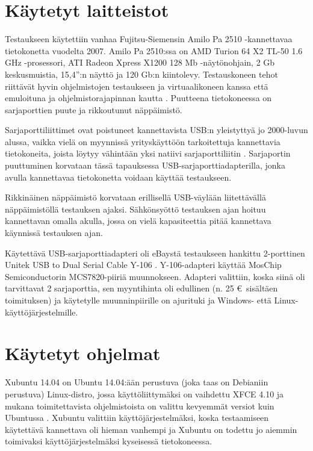 \section{Käytetyt laitteistot}

Testaukseen käytettiin vanhaa Fujitsu-Siemensin Amilo Pa 2510 -kannettavaa tietokonetta vuodelta 2007. Amilo Pa 2510:ssa on AMD Turion 64 X2 TL-50 1.6 GHz -prosessori, ATI Radeon Xpress X1200 128 Mb -näytönohjain, 2 Gb keskusmuistia, 15,4'':n näyttö ja 120 Gb:n kiintolevy. Testauskoneen tehot riittävät hyvin ohjelmistojen testaukseen ja virtuaalikoneen kanssa että emuloituna ja ohjelmistorajapinnan kautta \cite{fs_amilo:review}. Puutteena tietokoneessa on sarjaporttien puute ja rikkoutunut näppäimistö.

Sarjaporttiliittimet ovat poistuneet kannettavista USB:n yleistyttyä jo 2000-luvun alussa, vaikka vielä on myynnissä yrityskäyttöön tarkoitettuja kannettavia tietokoneita, joista löytyy vähintään yksi natiivi sarjaporttiliitin \cite{hp:laptop}. Sarjaportin puuttuminen korvataan tässä tapauksessa USB-sarjaporttiadapterilla, jonka avulla kannettavaa tietokonetta voidaan käyttää testaukseen.

Rikkinäinen näppäimistö korvataan erillisellä USB-väylään liitettävällä näppäimistöllä testauksen ajaksi. Sähkönsyöttö testauksen ajan hoituu kannettavan omalla akulla, jossa on vielä kapasiteettia pitää kannettava käynnissä testauksen ajan.

Käytettävä USB-sarjaporttiadapteri oli eBaystä testaukseen hankittu 2-porttinen Unitek USB to Dual Serial Cable Y-106 \cite{serial:unitek}. Y-106-adapteri käyttää MosChip Semiconductorin MCS7820-piiriä muunnokseen. Adapteri valittiin, koska siinä oli tarvittavat 2 sarjaporttia, sen myyntihinta oli edullinen (n. 25 € sisältäen toimituksen) ja käytetylle muunninpiirille on ajurituki ja Windows- että Linux-käyttöjärjestelmille.


\section{Käytetyt ohjelmat}

Xubuntu 14.04 on Ubuntu 14.04:ään perustuva (joka taas on Debianiin perustuva) Linux-distro, jossa käyttöliittymäksi on vaihdettu XFCE 4.10 ja mukana toimitettavista ohjelmistoista on valittu kevyemmät versiot kuin Ubuntussa \cite{xubuntu:about}. Xubuntu valittiin käyttöjärjestelmäksi, koska testaamiseen käytettävä kannettava oli hieman vanhempi ja Xubuntu on todettu jo aiemmin toimivaksi käyttöjärjestelmäksi kyseisessä tietokoneessa.

